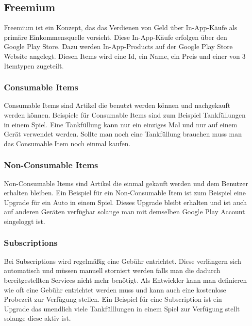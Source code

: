 \documentclass[FIPLY_base.tex]{subfiles}
\begin{document}
\subsection{Freemium}
Freemium ist ein Konzept, das das Verdienen von Geld über In-App-Käufe als primäre Einkommensquelle vorsieht.
Diese In-App-Käufe erfolgen über den Google Play Store. 
Dazu werden In-App-Products auf der Google Play Store Website angelegt.
Diesen Items wird eine Id, ein Name, ein Preis und einer von 3 Itemtypen zugeteilt. 

\subsubsection{Consumable Items}
Consumable Items sind Artikel die benutzt werden können und nachgekauft werden können. 
Beispiele für Consumable Items sind zum Beispiel Tankfüllungen in einem Spiel.
Eine Tankfüllung kann nur ein einziges Mal und nur auf einem Gerät verwendet werden. Sollte man noch eine Tankfüllung brauchen muss man das Consumable Item noch einmal kaufen. 

\subsubsection{Non-Consumable Items} 
Non-Consumable Items sind Artikel die einmal gekauft werden und dem Benutzer erhalten bleiben.
Ein Beispiel für ein Non-Consumable Item ist zum Beispiel eine Upgrade für ein Auto in einem Spiel.
Dieses Upgrade bleibt erhalten und ist auch auf anderen Geräten verfügbar solange man mit demselben Google Play Account eingeloggt ist. 

\subsubsection{Subscriptions}
Bei Subscriptions wird regelmäßig eine Gebühr entrichtet.
Diese verlängern sich automatisch und müssen manuell storniert werden falls man die dadurch bereitgestellten Services nicht mehr benötigt.
Als Entwickler kann man definieren wie oft eine Gebühr entrichtet werden muss und kann auch eine kostenlose Probezeit zur Verfügung stellen. 
Ein Beispiel für eine Subscription ist ein Upgrade das unendlich viele Tankfülllungen in einem Spiel zur Verfügung stellt solange diese aktiv ist.
\end{document}
